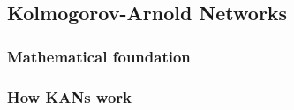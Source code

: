 \documentclass[12pt,a4paper,oneside]{article}
\begin{document}
\subsection{Kolmogorov-Arnold Networks}\label{subsec:lit_kan}



\subsubsection{Mathematical foundation}\label{subsubsec:kan_math}

%


\subsubsection{How KANs work}\label{subsubsec:kan_arch}

%
\end{document}
